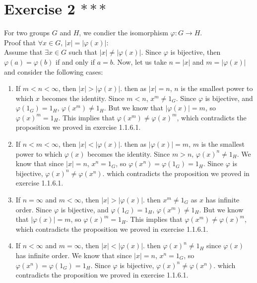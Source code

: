 \documentclass[12pt]{article}
\begin{document}
    \section*{Exercise 2 $***$}
    For two groups $G$ and $H$,
    we condier the isomorphism $\varphi: G \to H$. \\ 
    Proof that $\forall x \in G$, $|x| = |\varphi(x)|$: \\
    Assume that $\exists x \in G$
    such that  $|x| \neq |\varphi(x)|$.
    Since $\varphi$ is bijective,
    then $\varphi(a) = \varphi(b)$ if and only if $a = b$.
    Now, let us take $n = |x|$ and $m = |\varphi(x)|$
    and consider the following cases:
    \begin{enumerate}[label=\textbf{case \arabic*:}]
        \item
            If $m < n < \infty$,
            then $|x| > |\varphi(x)|$.
            then as $|x| = n$,
            $n$ is the smallest power to which $x$ becomes the identity.
            Since $m < n$, $x^m \neq 1_G$.
            Since $\varphi$ is bijective,
            and $\varphi(1_G) = 1_H$,
            $\varphi(x^m) \neq 1_H$.
            But we know that $|\varphi(x)| = m$,
            so $\varphi(x)^m = 1_H$.
            This implies that $\varphi(x^m) \neq \varphi(x)^m$,
            which contradicts the proposition we proved in exercise 1.1.6.1.
        \item 
            If $n < m < \infty$,
            then $|x| < |\varphi(x)|$.
            then as $|\varphi(x)| = m$,
            $m$ is the smallest power to which $\varphi(x)$ becomes the
            identity.
            Since $m > n$, $\varphi(x)^n \neq 1_H$.
            We know that since $|x| = n$, $x^n = 1_G$,
            so $\varphi(x^n) = \varphi(1_G) = 1_H$. 
            Since $\varphi$ is bijective,
            $\varphi(x)^n \neq \varphi(x^n)$.
            which contradicts the proposition we proved in exercise 1.1.6.1.
        \item
            If $n = \infty$ and $m < \infty$,
            then $|x| > |\varphi(x)|$.
            then $x^m \neq 1_G$ as $x$ has infinite order.
            Since $\varphi$ is bijective,
            and $\varphi(1_G) = 1_H$,
            $\varphi(x^m) \neq 1_H$.
            But we know that $|\varphi(x)| = m$,
            so $\varphi(x)^m = 1_H$.
            This implies that $\varphi(x^m) \neq \varphi(x)^m$,
            which contradicts the proposition we proved in exercise 1.1.6.1.
        \item
            If $n < \infty$ and $m = \infty$,
            then $|x| < |\varphi(x)|$.
            then $\varphi(x)^n \neq 1_H$
            since $\varphi(x)$ has infinite order.
            We know that since $|x| = n$, $x^n = 1_G$,
            so $\varphi(x^n) = \varphi(1_G) = 1_H$. 
            Since $\varphi$ is bijective,
            $\varphi(x)^n \neq \varphi(x^n)$.
            which contradicts the proposition we proved in exercise 1.1.6.1.
    \end{enumerate}   
\end{document}
